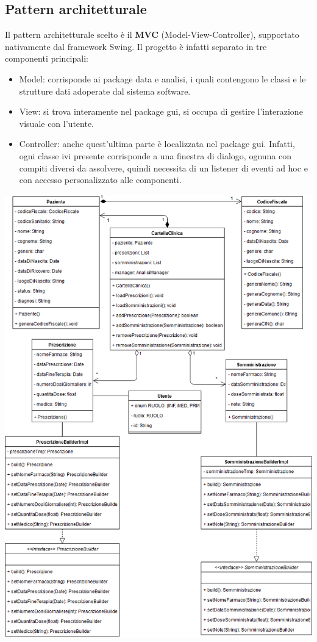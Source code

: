 \documentclass[a4paper]{report}
\begin{document}
        \subsection*{Pattern architetturale}
            Il pattern architetturale scelto è il \textbf{MVC} (Model-View-Controller), supportato nativamente dal framework Swing. Il progetto \`e infatti separato in tre componenti principali:
            \begin{itemize}
                \item Model: corrisponde ai package data e analisi, i quali contengono le classi e le strutture dati adoperate dal sistema software.
                \item View: si trova interamente nel package gui, si occupa di gestire l'interazione visuale con l'utente.
                \item Controller: anche quest'ultima parte \`e localizzata nel package gui. Infatti, ogni classe ivi presente corrisponde a una finestra di dialogo, ognuna con compiti diversi da assolvere, quindi necessita di un listener di eventi ad hoc e con accesso personalizzato alle componenti.
            \end{itemize}
                \begin{center}
                    \includegraphics[scale=0.30]{class/DataPackage.png}
                \end{center}
\end{document}

